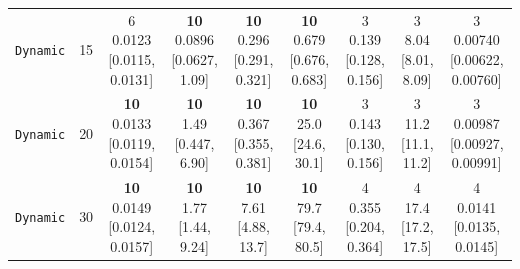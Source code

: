 \begin{tabular}{@{}lrccccccc@{}}
\texttt{Dynamic} & 15 & \makecell{6\\0.0123\\{[0.0115, 0.0131]}} & \makecell{\textbf{10}\\0.0896\\{[0.0627, 1.09]}} & \makecell{\textbf{10}\\0.296\\{[0.291, 0.321]}} & \makecell{\textbf{10}\\0.679\\{[0.676, 0.683]}} & \makecell{3\\0.139\\{[0.128, 0.156]}} & \makecell{3\\8.04\\{[8.01, 8.09]}} & \makecell{3\\0.00740\\{[0.00622, 0.00760]}} \\
\texttt{Dynamic} & 20 & \makecell{\textbf{10}\\0.0133\\{[0.0119, 0.0154]}} & \makecell{\textbf{10}\\1.49\\{[0.447, 6.90]}} & \makecell{\textbf{10}\\0.367\\{[0.355, 0.381]}} & \makecell{\textbf{10}\\25.0\\{[24.6, 30.1]}} & \makecell{3\\0.143\\{[0.130, 0.156]}} & \makecell{3\\11.2\\{[11.1, 11.2]}} & \makecell{3\\0.00987\\{[0.00927, 0.00991]}} \\
\texttt{Dynamic} & 30 & \makecell{\textbf{10}\\0.0149\\{[0.0124, 0.0157]}} & \makecell{\textbf{10}\\1.77\\{[1.44, 9.24]}} & \makecell{\textbf{10}\\7.61\\{[4.88, 13.7]}} & \makecell{\textbf{10}\\79.7\\{[79.4, 80.5]}} & \makecell{4\\0.355\\{[0.204, 0.364]}} & \makecell{4\\17.4\\{[17.2, 17.5]}} & \makecell{4\\0.0141\\{[0.0135, 0.0145]}} \\

\end{tabular}
